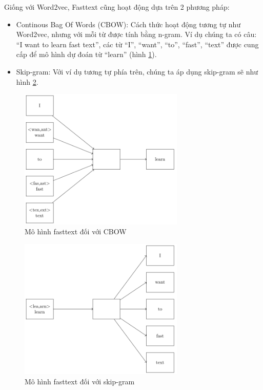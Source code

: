 Giống với Word2vec, Fasttext cũng hoạt động dựa trên 2 phương pháp:
\begin{itemize}
    \item Continous Bag Of Words (CBOW): Cách thức hoạt động tương tự như Word2vec, nhưng với mỗi từ được tính bằng n-gram. Ví dụ chúng ta có câu: ``I want to learn fast text'', các từ ``I'', ``want'', ``to'', ``fast'', ``text'' được cung cấp để mô hình dự đoán từ ``learn'' (hình \ref{figure:fasttext-cbow}).
    \item Skip-gram: Với ví dụ tương tự phía trên, chúng ta áp dụng skip-gram sẽ như hình \ref{figure:fasttext-skip-gram}.
\end{itemize}
\begin{figure}[htbp]
    \centering
    \includegraphics[width=0.7\textwidth]{tikz_image/fasttext_cbow.pdf}
    \caption{Mô hình fasttext đối với CBOW \cite{webpage14}}
    \label{figure:fasttext-cbow}
\end{figure}
\begin{figure}[htbp]
    \centering
    \includegraphics[width=0.7\textwidth]{tikz_image/fasttext_skipgram.pdf}
    \caption{Mô hình fasttext đối với skip-gram \cite{webpage14}}
    \label{figure:fasttext-skip-gram}
\end{figure}
